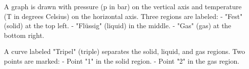 A graph is drawn with pressure (p in bar) on the vertical axis and temperature (T in degrees Celsius) on the horizontal axis. Three regions are labeled:  
- "Fest" (solid) at the top left.  
- "Flüssig" (liquid) in the middle.  
- "Gas" (gas) at the bottom right.  

A curve labeled "Tripel" (triple) separates the solid, liquid, and gas regions. Two points are marked:  
- Point "1" in the solid region.  
- Point "2" in the gas region.